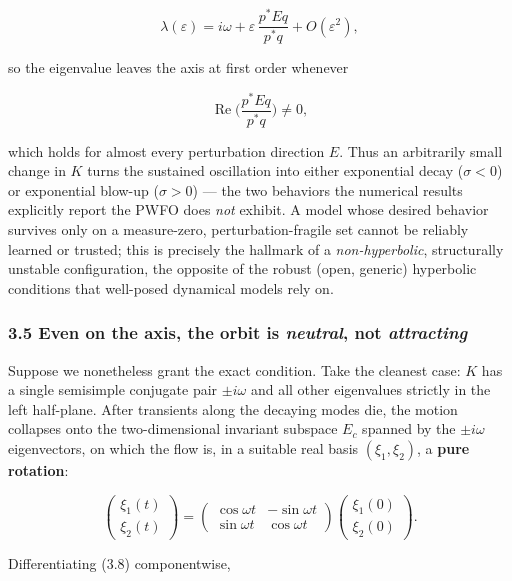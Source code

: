 \documentclass[
  11pt,
]{article}
\newcounter{none} %
\providecommand{\lt}{<}
\providecommand{\gt}{>}
\begin{document}
\[
\lambda(\varepsilon)=i\omega+\varepsilon\,\frac{p^{*}Eq}{p^{*}q}+O(\varepsilon^{2}),
\]

so the eigenvalue leaves the axis at first order whenever

\[
\operatorname{Re}\!\Big(\frac{p^{*}Eq}{p^{*}q}\Big)\ne 0,
\]

which holds for almost every perturbation direction \(E\). Thus an
arbitrarily small change in \(K\) turns the sustained oscillation into
either exponential decay (\(\sigma\lt 0\)) or exponential blow-up
(\(\sigma\gt 0\)) --- the two behaviors the numerical results explicitly
report the PWFO does \emph{not} exhibit. A model whose desired behavior
survives only on a measure-zero, perturbation-fragile set cannot be
reliably learned or trusted; this is precisely the hallmark of a
\emph{non-hyperbolic}, structurally unstable configuration, the opposite
of the robust (open, generic) hyperbolic conditions that well-posed
dynamical models rely on.

\subsubsection{\texorpdfstring{3.5 Even on the axis, the orbit is
\emph{neutral}, not
\emph{attracting}}{3.5 Even on the axis, the orbit is neutral, not attracting}}\label{even-on-the-axis-the-orbit-is-neutral-not-attracting}

Suppose we nonetheless grant the exact condition. Take the cleanest
case: \(K\) has a single semisimple conjugate pair \(\pm i\omega\) and
all other eigenvalues strictly in the left half-plane. After transients
along the decaying modes die, the motion collapses onto the
two-dimensional invariant subspace \(E_c\) spanned by the
\(\pm i\omega\) eigenvectors, on which the flow is, in a suitable real
basis \((\xi_1,\xi_2)\), a \textbf{pure rotation}:

\[
\begin{pmatrix}\xi_1(t)\\ \xi_2(t)\end{pmatrix}
=
\begin{pmatrix}\cos\omega t & -\sin\omega t\\[2pt] \sin\omega t & \cos\omega t\end{pmatrix}
\begin{pmatrix}\xi_1(0)\\ \xi_2(0)\end{pmatrix}.
\tag{3.8}
\]

Differentiating (3.8) componentwise,
\end{document}
